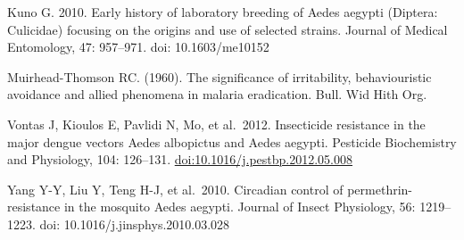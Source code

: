 \documentclass[]{article}
\begin{document}
Kuno G. 2010. Early history of laboratory breeding of Aedes aegypti
(Diptera: Culicidae) focusing on the origins and use of selected
strains. Journal of Medical Entomology, 47: 957--971. doi:
10.1603/me10152

Muirhead-Thomson RC. (1960). The significance of irritability,
behaviouristic avoidance and allied phenomena in malaria eradication.
Bull. Wid Hith Org.

Vontas J, Kioulos E, Pavlidi N, Mo, et al.~2012. Insecticide resistance
in the major dengue vectors Aedes albopictus and Aedes aegypti.
Pesticide Biochemistry and Physiology, 104: 126--131.
\url{doi:10.1016/j.pestbp.2012.05.008}

Yang Y-Y, Liu Y, Teng H-J, et al.~2010. Circadian control of
permethrin-resistance in the mosquito Aedes aegypti. Journal of Insect
Physiology, 56: 1219--1223. doi: 10.1016/j.jinsphys.2010.03.028
\end{document}
